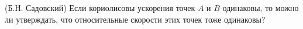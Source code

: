 (Б.Н. Садовский)
Если кориолисовы ускорения точек $A$ и $B$ одинаковы, то можно ли 
утверждать, что относительные скорости этих точек тоже одинаковы?
